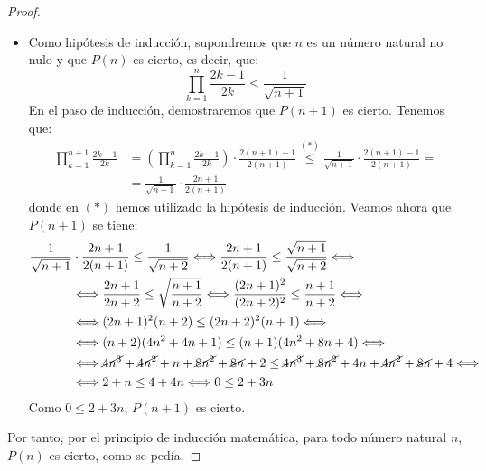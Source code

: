 \begin{ejercicio}
\begin{proof}
\begin{itemize}
            \item Como hipótesis de inducción, supondremos que $n$ es un número natural no nulo y que $P(n)$ es cierto, es decir, que:
                \begin{equation*}
                    \prod_{k=1}^n \frac{2k-1}{2k} \leq \frac{1}{\sqrt{n+1}}
                \end{equation*}
                En el paso de inducción, demostraremos que $P(n+1)$ es cierto. Tenemos que:
                \begin{align*}
                    \prod_{k=1}^{n+1} \frac{2k-1}{2k} &= \left(\prod_{k=1}^n \frac{2k-1}{2k}\right) \cdot \frac{2(n+1)-1}{2(n+1)} \stackrel{(\ast)}{\leq} \frac{1}{\sqrt{n+1}} \cdot \frac{2(n+1)-1}{2(n+1)} =\\
                    &= \frac{1}{\sqrt{n+1}} \cdot \frac{2n+1}{2(n+1)}
                \end{align*}
                donde en $(\ast)$ hemos utilizado la hipótesis de inducción. Veamos ahora que $P(n+1)$ se tiene:
                \begin{align*}
                    \frac{1}{\sqrt{n+1}} &\cdot \frac{2n+1}{2(n+1)}\leq \frac{1}{\sqrt{n+2}} \Longleftrightarrow \frac{2n+1}{2(n+1)}\leq \frac{\sqrt{n+1}}{\sqrt{n+2}} \Longleftrightarrow\\
                    &\Longleftrightarrow \frac{2n+1}{2n+2}\leq \sqrt{\frac{n+1}{n+2}}
                    \Longleftrightarrow \frac{(2n+1)^2}{(2n+2)^2}\leq \frac{n+1}{n+2} \Longleftrightarrow \\
                    &\Longleftrightarrow (2n+1)^2(n+2)\leq (2n+2)^2(n+1) \Longleftrightarrow\\
                    &\Longleftrightarrow (n+2)(4n^2+4n+1)\leq (n+1)(4n^2+8n+4) \Longleftrightarrow\\
                    &\Longleftrightarrow \cancel{4n^3}+\cancel{4n^2}+n+\cancel{8n^2}+\cancel{8n}+2\leq \cancel{4n^3}+\cancel{8n^2}+4n+\cancel{4n^2}+\cancel{8n}+4 \Longleftrightarrow\\
                    &\Longleftrightarrow 2+n \leq 4+4n \Longleftrightarrow 0 \leq 2+3n
                \end{align*}
                Como $0 \leq 2+3n$, $P(n+1)$ es cierto.
        \end{itemize}        
        Por tanto, por el principio de inducción matemática, para todo número natural $n$, $P(n)$ es cierto, como se pedía.
    \end{proof}
\end{ejercicio}


